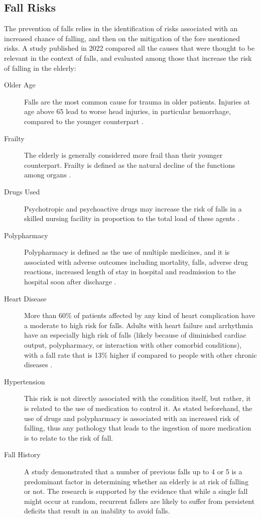 \subsection{Fall Risks}
The prevention of falls relies in the identification of risks associated with an increased chance of falling, and then on the mitigation of the fore mentioned risks.
A study published in 2022 \cite{RiskFactors} compared all the causes that were thought to be relevant in the context of falls, and evaluated among those that increase the risk of falling in the elderly:
\begin{description}
   \item[Older Age] Falls are the most common cause for trauma in older patients. Injuries at age above 65 lead to worse head injuries, in particular hemorrhage, compared to the younger counterpart \cite{geriatricTrauma}.
   \item[Frailty] The elderly is generally considered more frail than their younger counterpart. Frailty is defined as the natural decline of the functions among organs \cite{geriatricTrauma}.
   \item[Drugs Used] Psychotropic and psychoactive drugs may increase the risk of falls in a skilled nursing facility in proportion to the total load of these agents \cite{drugsEffects}.
   \item[Polypharmacy] Polypharmacy is defined as the use of multiple medicines, and it is associated with adverse outcomes including mortality, falls, adverse drug reactions, increased length of stay in hospital and readmission to the hospital soon after discharge \cite{PolypharmacyRisk}.
   \item[Heart Disease] More than 60\% of patients affected by any kind of heart complication have a moderate to high risk for falls. Adults with heart failure and arrhythmia have an especially high risk of falls (likely because of diminished cardiac output, polypharmacy, or interaction with other comorbid conditions), with a fall rate that is 13\% higher if compared to people with other chronic diseases \cite{HeartRisk}.
   \item[Hypertension] This risk is not directly associated with the condition itself, but rather, it is related to the use of medication to control it. As stated beforehand, the use of drugs and polypharmacy is associated with an increased risk of falling, thus any pathology that leads to the ingestion of more medication is to relate to the risk of fall. 
   \item[Fall History] A study \cite{HistoryRisk} demonstrated that a number of previous falls up to 4 or 5 is a predominant factor in determining whether an elderly is at risk of falling or not. The research is supported by the evidence that while a single fall might occur at random, recurrent fallers are likely to suffer from persistent deficits that result in an inability to avoid falls.

\end{description}
